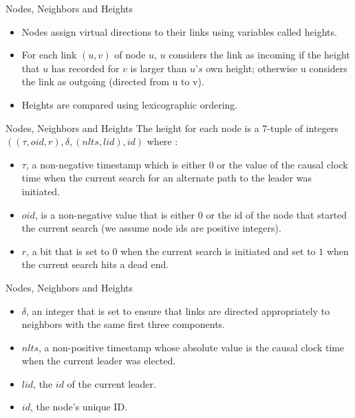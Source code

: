\documentclass{beamer}
\begin{document}
\begin{frame}{Nodes, Neighbors and Heights}
	\begin{itemize}
		\item Nodes assign virtual directions to their links using variables called heights.
		\item For each link $(u, v)$ of node $u$, $u$ considers the link as incoming if the height that $u$ has recorded for $v$ is larger than $u’s$ own height; otherwise u considers the link as outgoing (directed from u to v).
		\item Heights are compared using lexicographic ordering.
	\end{itemize}
\end{frame}
\begin{frame}{Nodes, Neighbors and Heights}
		The height for each node is a 7-tuple of integers $((\tau , oid, r), \delta , (nlts, lid), id)$ where :
		\begin{itemize}
			\item $\tau$, a non-negative timestamp which is either 0 or the value of the causal clock time when the current search for an alternate path to the leader was initiated.
			\item $oid$, is a non-negative value that is either 0 or the id of the node that started the current search (we assume node ids are positive integers).
			\item $r$, a bit that is set to $0$ when the current search is initiated and set to $1$ when the current search hits a dead end.
		\end{itemize}
\end{frame}

\begin{frame}{Nodes, Neighbors and Heights}
\begin{itemize}

		\item $\delta$, an integer that is set to ensure that links are directed appropriately to neighbors with the same first three components.
	\item $nlts$, a non-positive timestamp whose absolute value is the causal clock time when the current leader was elected.
	\item $lid$, the $id$ of the current leader.
	\item $id$, the node’s unique ID.
\end{itemize}
\end{frame}
\end{document}

